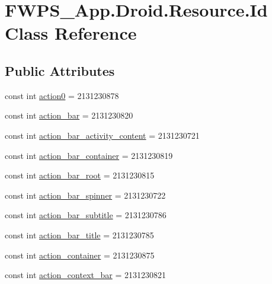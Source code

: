 \hypertarget{class_f_w_p_s___app_1_1_droid_1_1_resource_1_1_id}{}\section{F\+W\+P\+S\+\_\+\+App.\+Droid.\+Resource.\+Id Class Reference}
\label{class_f_w_p_s___app_1_1_droid_1_1_resource_1_1_id}
\subsection*{Public Attributes}
\begin{DoxyCompactItemize}
\item 
const int \mbox{\hyperlink{class_f_w_p_s___app_1_1_droid_1_1_resource_1_1_id_a29bd719f5fa6aae07e268e7cdb82922f}{action0}} = 2131230878
\item 
const int \mbox{\hyperlink{class_f_w_p_s___app_1_1_droid_1_1_resource_1_1_id_ac0c7974b38ad40d0bc0ba01fb823cdae}{action\+\_\+bar}} = 2131230820
\item 
const int \mbox{\hyperlink{class_f_w_p_s___app_1_1_droid_1_1_resource_1_1_id_a9f31293e5a9ad553a0f731fff9b75ac9}{action\+\_\+bar\+\_\+activity\+\_\+content}} = 2131230721
\item 
const int \mbox{\hyperlink{class_f_w_p_s___app_1_1_droid_1_1_resource_1_1_id_aa20454ffc3f2ac04dc61f53386f42528}{action\+\_\+bar\+\_\+container}} = 2131230819
\item 
const int \mbox{\hyperlink{class_f_w_p_s___app_1_1_droid_1_1_resource_1_1_id_ad7b4862946a99b2c334ac5f62da0f0a2}{action\+\_\+bar\+\_\+root}} = 2131230815
\item 
const int \mbox{\hyperlink{class_f_w_p_s___app_1_1_droid_1_1_resource_1_1_id_ac7dfd8008d915b5d9db88dc6230fd537}{action\+\_\+bar\+\_\+spinner}} = 2131230722
\item 
const int \mbox{\hyperlink{class_f_w_p_s___app_1_1_droid_1_1_resource_1_1_id_a4d023c22dc02e0b72625fe5ceeb02555}{action\+\_\+bar\+\_\+subtitle}} = 2131230786
\item 
const int \mbox{\hyperlink{class_f_w_p_s___app_1_1_droid_1_1_resource_1_1_id_abc29c2311ad06ac98b4adebf6c6ea117}{action\+\_\+bar\+\_\+title}} = 2131230785
\item 
const int \mbox{\hyperlink{class_f_w_p_s___app_1_1_droid_1_1_resource_1_1_id_af353f52881f869f3ab8a6e74f31ab1fc}{action\+\_\+container}} = 2131230875
\item 
const int \mbox{\hyperlink{class_f_w_p_s___app_1_1_droid_1_1_resource_1_1_id_aecbe569ff48b112ca5740ec24b156787}{action\+\_\+context\+\_\+bar}} = 2131230821

\end{DoxyCompactItemize}
